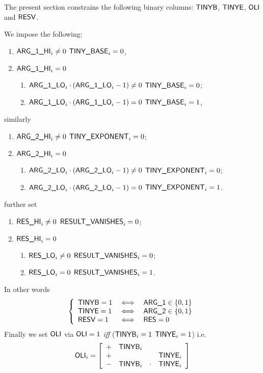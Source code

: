 The present section constrains the following binary columns: $\textsf{TINYB}$, $\textsf{TINYE}$, $\textsf{OLI}{}$ and $\textsf{RESV}$.
\begin{center}
\end{center}
We impose the following:
\begin{enumerate}
	\item \If $\textsf{ARG}\textsf{\_1}\textsf{\_HI}_{i} \neq 0$ \Then $\textsf{TINY\_BASE}_{i} = 0$,
	\item \If $\textsf{ARG}\textsf{\_1}\textsf{\_HI}_{i} =    0$ \Then
		\begin{enumerate}
			\item \If $\textsf{ARG}\textsf{\_1}\textsf{\_LO}_{i} \cdot (\textsf{ARG}\textsf{\_1}\textsf{\_LO}_{i} - 1) \neq 0$ \Then $\textsf{TINY\_BASE}_{i} = 0$;
			\item \If $\textsf{ARG}\textsf{\_1}\textsf{\_LO}_{i} \cdot (\textsf{ARG}\textsf{\_1}\textsf{\_LO}_{i} - 1) =    0$ \Then $\textsf{TINY\_BASE}_{i} = 1$,
		\end{enumerate}
\end{enumerate}
similarly
\begin{enumerate}
	\item \If $\textsf{ARG}\textsf{\_2}\textsf{\_HI}_{i} \neq 0$ \Then $\textsf{TINY\_EXPONENT}_{i} = 0$;
	\item \If $\textsf{ARG}\textsf{\_2}\textsf{\_HI}_{i} =    0$ \Then
		\begin{enumerate}
			\item \If $\textsf{ARG}\textsf{\_2}\textsf{\_LO}_{i} \cdot (\textsf{ARG}\textsf{\_2}\textsf{\_LO}_{i} - 1) \neq 0$ \Then $\textsf{TINY\_EXPONENT}_{i} = 0$;
			\item \If $\textsf{ARG}\textsf{\_2}\textsf{\_LO}_{i} \cdot (\textsf{ARG}\textsf{\_2}\textsf{\_LO}_{i} - 1) =    0$ \Then $\textsf{TINY\_EXPONENT}_{i} = 1$.
		\end{enumerate}
\end{enumerate}
further set
\begin{enumerate}
	\item \If $\textsf{RES}\textsf{\_HI}_{i} \neq 0$ \Then $\textsf{RESULT\_VANISHES}_{i} = 0$;
	\item \If $\textsf{RES}\textsf{\_HI}_{i} =    0$ \Then
		\begin{enumerate}
			\item \If $\textsf{RES}\textsf{\_LO}_{i} \neq 0$ \Then $\textsf{RESULT\_VANISHES}_{i} = 0$;
			\item \If $\textsf{RES}\textsf{\_LO}_{i} =    0$ \Then $\textsf{RESULT\_VANISHES}_{i} = 1$.
		\end{enumerate}
\end{enumerate}
In other words
\[
	\left\{ \begin{array}{lcl}
		\textsf{TINYB}     = 1 & \iff & \textsf{ARG}\textsf{\_1} \in \{0,1\} \\
		\textsf{TINYE} = 1 & \iff & \textsf{ARG}\textsf{\_2} \in \{0,1\} \\
		\textsf{RESV}  = 1 & \iff & \textsf{RES} = 0 \\
	\end{array} \right.
\]
Finally we set $\textsf{OLI}$ via $\textsf{OLI} = 1$ \emph{iff} \big($\textsf{TINYB}_{i} = 1$ \OR{} $\textsf{TINYE}_{i} = 1$\big) i.e.
\[
	\textsf{OLI}_{i} =
	\left[ \begin{array}{crcl}
		+ & \textsf{TINYB}_{i} &       &                   \\
		+ &               &       & \textsf{TINYE}_{i} \\
		- & \textsf{TINYB}_{i} & \cdot & \textsf{TINYE}_{i} \\
	\end{array} \right]
\]
